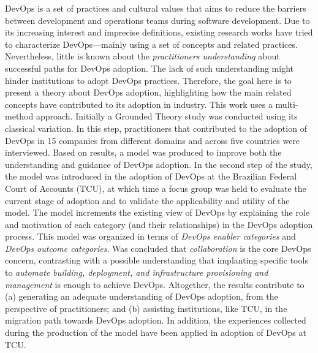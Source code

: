 DevOps is a set of practices and cultural values that aims to reduce the
barriers between development and operations teams during software development.
Due to its increasing interest and imprecise definitions, existing research
works have tried to characterize DevOps---mainly using a set of concepts and
related practices. Nevertheless, little is known about the \emph{practitioners
understanding} about successful paths for DevOps adoption. The lack of such
understanding might hinder institutions to adopt DevOps practices. Therefore,
the goal here is to present a theory about DevOps adoption, highlighting how the
main related concepts have contributed to its adoption in industry. This work
uses a multi-method approach. Initially a Grounded Theory study was
conducted using its classical variation. In this step, practitioners
that contributed to the adoption of DevOps in 15 companies from different
domains and across five countries were interviewed. Based on results, a model
was produced to improve both the understanding and guidance of DevOps adoption.
In the second step of the study, the model was introduced in the adoption of
DevOps at the Brazilian Federal Court of Accounts (TCU), at which time a focus
group was held to evaluate the current stage of adoption and to validate the
applicability and utility of the model. The model increments the existing view
of DevOps by explaining the role and motivation of each category (and their
relationships) in the DevOps adoption process. This model was organized in
terms of \emph{DevOps enabler categories} and \emph{DevOps outcome categories}.
Was concluded that \emph{collaboration} is the core DevOps concern, contrasting
with a possible understanding that implanting specific tools to \emph{automate
building, deployment, and infrastructure provisioning and management} is enough
to achieve DevOps. Altogether, the results contribute to (a) generating an
adequate understanding of DevOps adoption, from the perspective of
practitioners; and (b) assisting institutions, like \acrshort{TCU}, in the
migration path towards DevOps adoption. In addition, the experiences collected
during the production of the model have been applied in adoption of DevOps at TCU.
